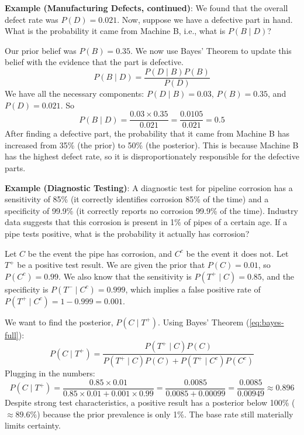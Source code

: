 \begin{exampleBox}
    \textbf{Example (Manufacturing Defects, continued)}: We found that the overall defect rate was $P(D) = 0.021$. Now, suppose we have a defective part in hand. What is the probability it came from Machine B, i.e., what is $P(B\mid D)$?

    Our prior belief was $P(B) = 0.35$. We now use Bayes' Theorem to update this belief with the evidence that the part is defective.
    \begin{equation}
        P(B \mid D) = \frac{P(D \mid B)P(B)}{P(D)}
    \end{equation}
    We have all the necessary components: $P(D \mid B)=0.03$, $P(B)=0.35$, and $P(D)=0.021$. So
    \begin{equation}
        P(B \mid D) = \frac{0.03 \times 0.35}{0.021} = \frac{0.0105}{0.021} = 0.5
    \end{equation}
    After finding a defective part, the probability that it came from Machine B has increased from 35\% (the prior) to 50\% (the posterior). This is because Machine B has the highest defect rate, so it is disproportionately responsible for the defective parts.
\end{exampleBox}

\begin{exampleBox}
    \textbf{Example (Diagnostic Testing)}: A diagnostic test for pipeline corrosion has a sensitivity of 85\% (it correctly identifies corrosion 85\% of the time) and a specificity of 99.9\% (it correctly reports no corrosion 99.9\% of the time). Industry data suggests that this corrosion is present in 1\% of pipes of a certain age. If a pipe tests positive, what is the probability it actually has corrosion?

    Let $C$ be the event the pipe has corrosion, and $C^c$ be the event it does not. Let $T^+$ be a positive test result. We are given the prior that $P(C) = 0.01$, so $P(C^c) = 0.99$. We also know that the sensitivity is $P(T^+ \mid C)=0.85$, and the specificity is $P(T^- \mid C^c)=0.999$, which implies a false positive rate of $P(T^+ \mid C^c) = 1 - 0.999 = 0.001$.

    We want to find the posterior, $P(C \mid T^+)$. Using Bayes' Theorem (\autoref{eq:bayes-full}):
    \begin{equation}
        P(C \mid T^+) = \frac{P(T^+ \mid C)P(C)}{P(T^+ \mid C)P(C) + P(T^+ \mid C^c)P(C^c)}
    \end{equation}
    Plugging in the numbers:
    \begin{equation}
        P(C \mid T^+) = \frac{0.85 \times 0.01}{0.85 \times 0.01 + 0.001 \times 0.99} = \frac{0.0085}{0.0085 + 0.00099} = \frac{0.0085}{0.00949} \approx 0.896
    \end{equation}
    Despite strong test characteristics, a positive result has a posterior below 100\% ($\approx 89.6\%$) because the prior prevalence is only 1\%. The base rate still materially limits certainty.
\end{exampleBox}

